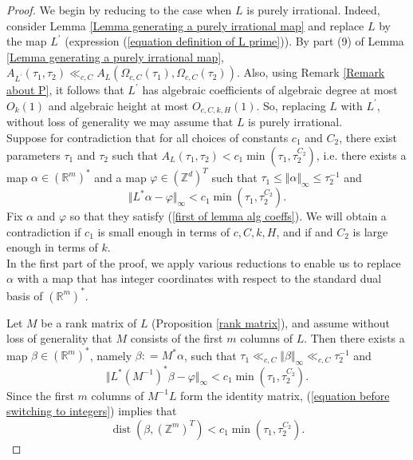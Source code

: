 \documentclass[12pt,a4paper,twoside,reqno]{amsart}
\newcommand{\dist}{\operatorname{dist}}
\numberwithin{equation}{section}
\begin{document}
\begin{proof}
We begin by reducing to the case when $L$ is purely irrational. Indeed, consider Lemma \ref{Lemma generating a purely irrational map} and replace $L$ by the map $L^\prime$ (expression (\ref{equation definition of L prime})). By part (9) of Lemma \ref{Lemma generating a purely irrational map}, $A_{L^\prime}(\tau_1,\tau_2)\ll_{c,C} A_L(\Omega_{c,C}(\tau_1),\Omega_{c,C}(\tau_2))$. Also, using Remark \ref{Remark about P}, it follows that $L^\prime$ has algebraic coefficients of algebraic degree at most $O_{k}(1)$ and algebraic height at most $O_{c,C,k,H}(1)$.  So, replacing $L$ with $L^\prime$, without loss of generality we may assume that $L$ is purely irrational. \\

Suppose for contradiction that for all choices of constants $c_1$ and $C_2$, there exist parameters $\tau_1$ and $\tau_2$ such that $A_L(\tau_1,\tau_2) < c_1 \min(\tau_1, \tau_2^{C_2})$, i.e. there exists a map $\alpha \in (\mathbb{R}^m)^*$ and a map $\varphi \in (\mathbb{Z}^d)^T$ such that  $\tau_1\leqslant \Vert \alpha\Vert_\infty \leqslant \tau_2^{-1}$ and 
\begin{equation}
\label{first of lemma alg coeffs}
\Vert L^*\alpha - \varphi\Vert_\infty <c_1 \min(\tau_1,\tau_2^{C_2}).
\end{equation}
\noindent Fix $\alpha$ and $\varphi$ so that they satisfy (\ref{first of lemma alg coeffs}). We will obtain a contradiction if $c_1$ is small enough in terms of $c,C,k,H$, and if and $C_2$ is large enough in terms of $k$. \\


In the first part of the proof, we apply various reductions to enable us to replace $\alpha$ with a map that has integer coordinates with respect to the standard dual basis of $(\mathbb{R}^m)^*$. 


Let $M$ be a rank matrix of $L$ (Proposition \ref{rank matrix}), and assume without loss of generality that $M$ consists of the first $m$ columns of $L$. Then there exists a map $\beta \in (\mathbb{R}^m)^*$, namely $\beta: = M^* \alpha$, such that $\tau_1 \ll_{c,C} \Vert \beta\Vert_\infty \ll_{c,C} \tau_2^{-1}$ and
\begin{equation}
\label{equation before switching to integers}
 \Vert L^* (M^{-1})^* \beta - \varphi\Vert_\infty < c_1 \min(\tau_1,\tau_2^{C_2}).
 \end{equation}
 Since the first $m$ columns of $M^{-1} L$ form the identity matrix, (\ref{equation before switching to integers}) implies that
\begin{equation}
\label{equation beta integer norm bound}
\dist(\beta, (\mathbb{Z}^m)^T) < c_1 \min(\tau_1,\tau_2^{C_2}).
\end{equation} 


\end{proof}
\end{document}

